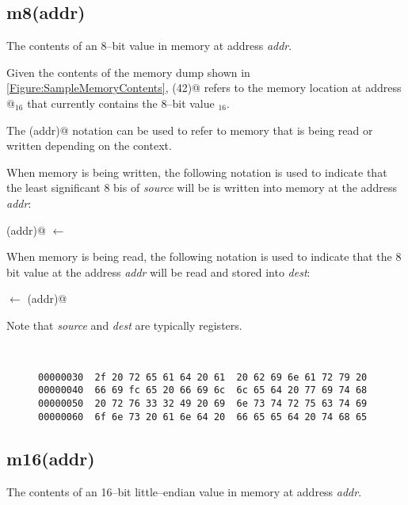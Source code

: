 \subsection{m8(addr)}
\label{memory:m8}

The contents of an 8--bit value in memory at address {\em addr}.

Given the contents of the memory dump shown in 
\autoref{Figure:SampleMemoryContents}, 
(42)@ refers to the memory location at address @$_{16}$ 
that currently contains the 8--bit value \verb@fc@$_{16}$.

The \verb@mn(addr)@ notation can be used to refer to memory that is being 
read or written depending on the context.  

When memory is being written, the following notation is used to indicate that 
the least significant 8 bis of {\em source} will be is written into memory at 
the address {\em addr}:

(addr)@ $\leftarrow$ \verb@source@

When memory is being read, the following notation is used to indicate that the 
8 bit value at the address {\em addr} will be read and stored into {\em dest}:

\verb@dest@ $\leftarrow$ (addr)@ 

Note that {\em source} and {\em dest} are typically registers.
 

\begin{figure}[ht]
\centering
\begin{BVerbatim}


00000030  2f 20 72 65 61 64 20 61  20 62 69 6e 61 72 79 20
00000040  66 69 fc 65 20 66 69 6c  6c 65 64 20 77 69 74 68
00000050  20 72 76 33 32 49 20 69  6e 73 74 72 75 63 74 69
00000060  6f 6e 73 20 61 6e 64 20  66 65 65 64 20 74 68 65
\end{BVerbatim}
\label{Figure:SampleMemoryContents}
\end{figure}

\subsection{m16(addr)}

The contents of an 16--bit little--endian value in memory at address {\em addr}.

